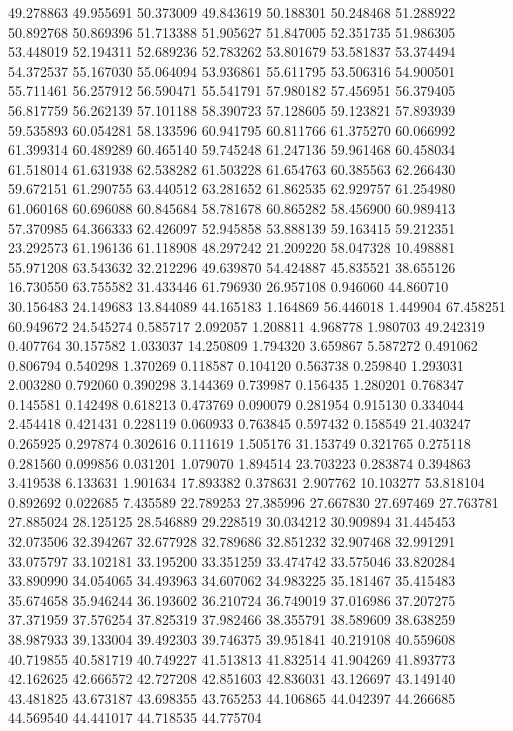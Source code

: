 49.278863
49.955691
50.373009
49.843619
50.188301
50.248468
51.288922
50.892768
50.869396
51.713388
51.905627
51.847005
52.351735
51.986305
53.448019
52.194311
52.689236
52.783262
53.801679
53.581837
53.374494
54.372537
55.167030
55.064094
53.936861
55.611795
53.506316
54.900501
55.711461
56.257912
56.590471
55.541791
57.980182
57.456951
56.379405
56.817759
56.262139
57.101188
58.390723
57.128605
59.123821
57.893939
59.535893
60.054281
58.133596
60.941795
60.811766
61.375270
60.066992
61.399314
60.489289
60.465140
59.745248
61.247136
59.961468
60.458034
61.518014
61.631938
62.538282
61.503228
61.654763
60.385563
62.266430
59.672151
61.290755
63.440512
63.281652
61.862535
62.929757
61.254980
61.060168
60.696088
60.845684
58.781678
60.865282
58.456900
60.989413
57.370985
64.366333
62.426097
52.945858
53.888139
59.163415
59.212351
23.292573
61.196136
61.118908
48.297242
21.209220
58.047328
10.498881
55.971208
63.543632
32.212296
49.639870
54.424887
45.835521
38.655126
16.730550
63.755582
31.433446
61.796930
26.957108
0.946060
44.860710
30.156483
24.149683
13.844089
44.165183
1.164869
56.446018
1.449904
67.458251
60.949672
24.545274
0.585717
2.092057
1.208811
4.968778
1.980703
49.242319
0.407764
30.157582
1.033037
14.250809
1.794320
3.659867
5.587272
0.491062
0.806794
0.540298
1.370269
0.118587
0.104120
0.563738
0.259840
1.293031
2.003280
0.792060
0.390298
3.144369
0.739987
0.156435
1.280201
0.768347
0.145581
0.142498
0.618213
0.473769
0.090079
0.281954
0.915130
0.334044
2.454418
0.421431
0.228119
0.060933
0.763845
0.597432
0.158549
21.403247
0.265925
0.297874
0.302616
0.111619
1.505176
31.153749
0.321765
0.275118
0.281560
0.099856
0.031201
1.079070
1.894514
23.703223
0.283874
0.394863
3.419538
6.133631
1.901634
17.893382
0.378631
2.907762
10.103277
53.818104
0.892692
0.022685
7.435589
22.789253
27.385996
27.667830
27.697469
27.763781
27.885024
28.125125
28.546889
29.228519
30.034212
30.909894
31.445453
32.073506
32.394267
32.677928
32.789686
32.851232
32.907468
32.991291
33.075797
33.102181
33.195200
33.351259
33.474742
33.575046
33.820284
33.890990
34.054065
34.493963
34.607062
34.983225
35.181467
35.415483
35.674658
35.946244
36.193602
36.210724
36.749019
37.016986
37.207275
37.371959
37.576254
37.825319
37.982466
38.355791
38.589609
38.638259
38.987933
39.133004
39.492303
39.746375
39.951841
40.219108
40.559608
40.719855
40.581719
40.749227
41.513813
41.832514
41.904269
41.893773
42.162625
42.666572
42.727208
42.851603
42.836031
43.126697
43.149140
43.481825
43.673187
43.698355
43.765253
44.106865
44.042397
44.266685
44.569540
44.441017
44.718535
44.775704
